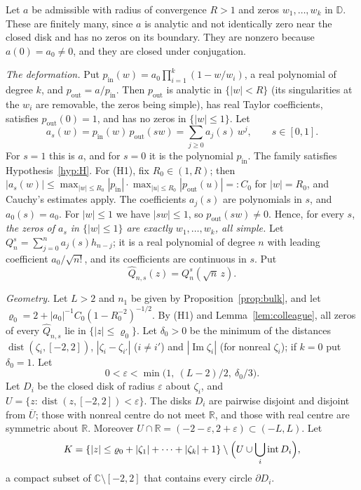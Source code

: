 \documentclass[11pt]{amsart}
\theoremstyle{definition}
\theoremstyle{remark}
\numberwithin{equation}{section}
\newcommand{\C}{\mathbb{C}}
\newcommand{\R}{\mathbb{R}}
\newcommand{\D}{\mathbb{D}}
\newcommand{\eps}{\varepsilon}
\DeclareMathOperator{\im}{Im}
\DeclareMathOperator{\dist}{dist}
\begin{document}
Let $a$ be admissible with radius of convergence $R>1$ and zeros $w_1,\dots,w_k$ in $\D$. These are finitely many, since $a$ is analytic and not identically zero near the closed disk and has no zeros on its boundary. They are nonzero because $a(0)=a_0\ne0$, and they are closed under conjugation.

\emph{The deformation.} Put $p_{\mathrm{in}}(w)=a_0\prod_{i=1}^{k}(1-w/w_i)$, a real polynomial of degree $k$, and $p_{\mathrm{out}}=a/p_{\mathrm{in}}$. Then $p_{\mathrm{out}}$ is analytic in $\{|w|<R\}$ (its singularities at the $w_i$ are removable, the zeros being simple), has real Taylor coefficients, satisfies $p_{\mathrm{out}}(0)=1$, and has no zeros in $\{|w|\le1\}$. Let
\[
a_s(w)=p_{\mathrm{in}}(w)\,p_{\mathrm{out}}(sw)=\sum_{j\ge0}a_j(s)\,w^j,\qquad s\in[0,1].
\]
For $s=1$ this is $a$, and for $s=0$ it is the polynomial $p_{\mathrm{in}}$. The family satisfies Hypothesis~\ref{hyp:H}. For (H1), fix $R_0\in(1,R)$; then $|a_s(w)|\le\max_{|w|\le R_0}|p_{\mathrm{in}}|\cdot\max_{|u|\le R_0}|p_{\mathrm{out}}(u)|=:C_0$ for $|w|=R_0$, and Cauchy's estimates apply. The coefficients $a_j(s)$ are polynomials in $s$, and $a_0(s)=a_0$. For $|w|\le1$ we have $|sw|\le1$, so $p_{\mathrm{out}}(sw)\ne0$. Hence, for every $s$, \emph{the zeros of $a_s$ in $\{|w|\le1\}$ are exactly $w_1,\dots,w_k$, all simple.} Let $Q_n^s=\sum_{j=0}^{n}a_j(s)h_{n-j}$; it is a real polynomial of degree $n$ with leading coefficient $a_0/\sqrt{n!}$, and its coefficients are continuous in $s$. Put
\[
\widehat Q_{n,s}(z)=Q_n^s(\sqrt n\,z).
\]

\emph{Geometry.} Let $L>2$ and $n_1$ be given by Proposition~\ref{prop:bulk}, and let $\varrho_0=2+|a_0|^{-1}C_0(1-R_0^{-2})^{-1/2}$. By (H1) and Lemma~\ref{lem:colleague}, all zeros of every $\widehat Q_{n,s}$ lie in $\{|z|\le\varrho_0\}$. Let $\delta_0>0$ be the minimum of the distances $\dist(\zeta_i,[-2,2])$, $|\zeta_i-\zeta_{i'}|$ ($i\ne i'$) and $|\im\zeta_i|$ (for nonreal $\zeta_i$); if $k=0$ put $\delta_0=1$. Let
\[
0<\eps<\min\bigl(1,\ (L-2)/2,\ \delta_0/3\bigr).
\]
Let $D_i$ be the closed disk of radius $\eps$ about $\zeta_i$, and $U=\{z:\dist(z,[-2,2])<\eps\}$. The disks $D_i$ are pairwise disjoint and disjoint from $\overline U$; those with nonreal centre do not meet $\R$, and those with real centre are symmetric about $\R$. Moreover $U\cap\R=(-2-\eps,2+\eps)\subset(-L,L)$. Let
\[
K=\{|z|\le\varrho_0+|\zeta_1|+\dots+|\zeta_k|+1\}\setminus\Bigl(U\cup\bigcup_i\operatorname{int}D_i\Bigr),
\]
a compact subset of $\C\setminus[-2,2]$ that contains every circle $\partial D_i$.
\end{document}
